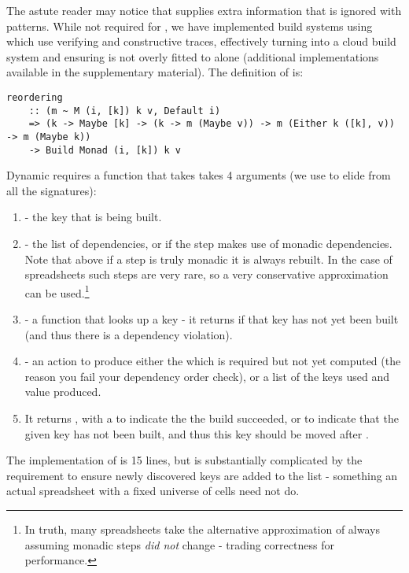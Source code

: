 The astute reader may notice that  supplies extra information that is ignored with \hs{_} patterns. While not required for \Excel, we have implemented build systems using  which use verifying and constructive traces, effectively turning \Excel into a cloud build system and ensuring  is not overly fitted to \Excel alone (additional implementations available in the supplementary material). The definition of  is:

\begin{verbatim}
reordering
    :: (m ~ M (i, [k]) k v, Default i)
    => (k -> Maybe [k] -> (k -> m (Maybe v)) -> m (Either k ([k], v)) -> m (Maybe k))
    -> Build Monad (i, [k]) k v
\end{verbatim}

Dynamic requires a function that takes takes 4 arguments (we use  to elide  from all the signatures):

\begin{enumerate}
\item {} - the key that is being built.
\item {} - the list of dependencies, or  if the step makes use of monadic dependencies. Note that above if a step is truly monadic it is always rebuilt. In the case of spreadsheets such steps are very rare, so a very conservative approximation can be used.\footnote{In truth, many spreadsheets take the alternative approximation of always assuming monadic steps \textit{did not} change - trading correctness for performance.}
\item {} - a function that looks up a key - it returns  if that key has not yet been built (and thus there is a dependency violation).
\item {} - an action to produce either the  which is required but not yet computed (the reason you fail your dependency order check), or a list of the keys used and value produced.
\item It returns , with a  to indicate the the build succeeded, or  to indicate that the given key  has not been built, and thus this key should be moved after .
\end{enumerate}

The implementation of  is 15 lines, but is substantially complicated by the requirement to ensure newly discovered keys are added to the list - something an actual spreadsheet with a fixed universe of cells need not do.

